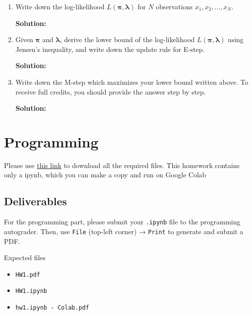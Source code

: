 \documentclass[11pt,epic]{article}
\newenvironment{solution}
  {\par\medskip
  \color{gray}%
   \begin{framed}
   \textbf{Solution: \newline}\ignorespaces}
 {\end{framed}
  \medskip}
\begin{document}
\begin{enumerate}[label=(\alph*)]
    \item Write down the log-likelihood $L(\boldsymbol{\pi}, \boldsymbol{\lambda})$ for $N$ observations $x_1, x_2, ..., x_N$.
    \begin{solution}
        
    \end{solution}
    \item Given $\boldsymbol{\pi}$ and $\boldsymbol{\lambda}$, derive the lower bound of the log-likelihood $L(\boldsymbol{\pi}, \boldsymbol{\lambda})$ using Jensen's inequality, and write down the update rule for E-step.
    \begin{solution}
        
    \end{solution}
    \item Write down the M-step which maximizes your lower bound written above. To receive full credits, you should provide the answer step by step.
    \begin{solution}
        
    \end{solution}
\end{enumerate}


\section{Programming}
Please use \href{https://drive.google.com/drive/folders/1YECQBUdEhWzw2gfg_ZYUWyohJu2xH1Ws?usp=drive_link}{this link} to download all the required files. This homework contains only a ipynb, which you can make a copy and run on Google Colab
\subsection*{Deliverables}
For the programming part, please submit your \texttt{.ipynb} file to the programming autograder. Then, use \texttt{File} (top-left corner) → \texttt{Print} to generate and submit a PDF.  

Expected files
\begin{itemize}
    \item \texttt{HW1.pdf}
    \item \texttt{HW1.ipynb}
    \item \texttt{hw1.ipynb - Colab.pdf}
\end{itemize}


 
\end{document}
